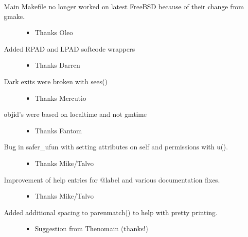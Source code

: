 \documentclass[letterpaper,10pt,english]{sphinxmanual}
\begin{document}
\begin{description}
\begin{itemize}
\end{itemize}

\item[{Main Makefile no longer worked on latest FreeBSD because of their change from gmake.}] \leavevmode\begin{itemize}
\item {} 
\sphinxAtStartPar
Thanks Oleo

\end{itemize}

\item[{Added RPAD and LPAD softcode wrappers}] \leavevmode\begin{itemize}
\item {} 
\sphinxAtStartPar
Thanks Darren

\end{itemize}

\item[{Dark exits were broken with sees()}] \leavevmode\begin{itemize}
\item {} 
\sphinxAtStartPar
Thanks Mercutio

\end{itemize}

\item[{objid’s were based on localtime and not gmtime}] \leavevmode\begin{itemize}
\item {} 
\sphinxAtStartPar
Thanks Fantom

\end{itemize}

\item[{Bug in safer\_ufun with setting attributes on self and permissions with u().}] \leavevmode\begin{itemize}
\item {} 
\sphinxAtStartPar
Thanks Mike/Talvo

\end{itemize}

\item[{Improvement of help entries for @label and various documentation fixes.}] \leavevmode\begin{itemize}
\item {} 
\sphinxAtStartPar
Thanks Mike/Talvo

\end{itemize}

\item[{Added additional spacing to parenmatch() to help with pretty printing.}] \leavevmode\begin{itemize}
\item {} 
\sphinxAtStartPar
Suggestion from Thenomain (thanks!)


\end{itemize}
\end{description}
\end{document}
